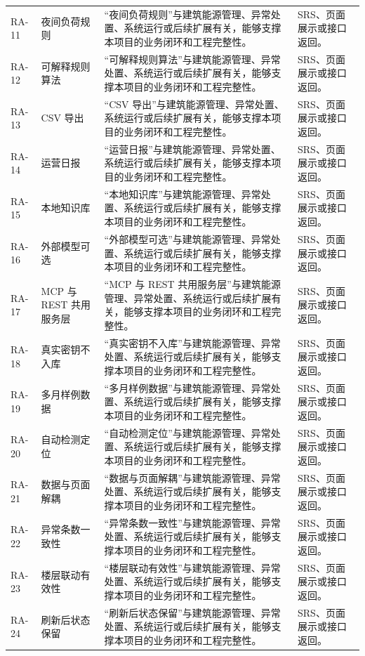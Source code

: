 \documentclass[12pt,a4paper]{ctexart}
\begin{document}
\begin{longtable}{L{1.7cm}L{4.4cm}L{6.0cm}L{3.4cm}}
RA-11 & 夜间负荷规则 & “夜间负荷规则”与建筑能源管理、异常处置、系统运行或后续扩展有关，能够支撑本项目的业务闭环和工程完整性。 & SRS、页面展示或接口返回。 \\
RA-12 & 可解释规则算法 & “可解释规则算法”与建筑能源管理、异常处置、系统运行或后续扩展有关，能够支撑本项目的业务闭环和工程完整性。 & SRS、页面展示或接口返回。 \\
RA-13 & CSV 导出 & “CSV 导出”与建筑能源管理、异常处置、系统运行或后续扩展有关，能够支撑本项目的业务闭环和工程完整性。 & SRS、页面展示或接口返回。 \\
RA-14 & 运营日报 & “运营日报”与建筑能源管理、异常处置、系统运行或后续扩展有关，能够支撑本项目的业务闭环和工程完整性。 & SRS、页面展示或接口返回。 \\
RA-15 & 本地知识库 & “本地知识库”与建筑能源管理、异常处置、系统运行或后续扩展有关，能够支撑本项目的业务闭环和工程完整性。 & SRS、页面展示或接口返回。 \\
RA-16 & 外部模型可选 & “外部模型可选”与建筑能源管理、异常处置、系统运行或后续扩展有关，能够支撑本项目的业务闭环和工程完整性。 & SRS、页面展示或接口返回。 \\
RA-17 & MCP 与 REST 共用服务层 & “MCP 与 REST 共用服务层”与建筑能源管理、异常处置、系统运行或后续扩展有关，能够支撑本项目的业务闭环和工程完整性。 & SRS、页面展示或接口返回。 \\
RA-18 & 真实密钥不入库 & “真实密钥不入库”与建筑能源管理、异常处置、系统运行或后续扩展有关，能够支撑本项目的业务闭环和工程完整性。 & SRS、页面展示或接口返回。 \\
RA-19 & 多月样例数据 & “多月样例数据”与建筑能源管理、异常处置、系统运行或后续扩展有关，能够支撑本项目的业务闭环和工程完整性。 & SRS、页面展示或接口返回。 \\
RA-20 & 自动检测定位 & “自动检测定位”与建筑能源管理、异常处置、系统运行或后续扩展有关，能够支撑本项目的业务闭环和工程完整性。 & SRS、页面展示或接口返回。 \\
RA-21 & 数据与页面解耦 & “数据与页面解耦”与建筑能源管理、异常处置、系统运行或后续扩展有关，能够支撑本项目的业务闭环和工程完整性。 & SRS、页面展示或接口返回。 \\
RA-22 & 异常条数一致性 & “异常条数一致性”与建筑能源管理、异常处置、系统运行或后续扩展有关，能够支撑本项目的业务闭环和工程完整性。 & SRS、页面展示或接口返回。 \\
RA-23 & 楼层联动有效性 & “楼层联动有效性”与建筑能源管理、异常处置、系统运行或后续扩展有关，能够支撑本项目的业务闭环和工程完整性。 & SRS、页面展示或接口返回。 \\
RA-24 & 刷新后状态保留 & “刷新后状态保留”与建筑能源管理、异常处置、系统运行或后续扩展有关，能够支撑本项目的业务闭环和工程完整性。 & SRS、页面展示或接口返回。 \\

\end{longtable}
\end{document}

